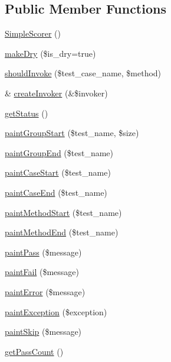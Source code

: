 \subsection*{Public Member Functions}
\begin{DoxyCompactItemize}
\item 
\hyperlink{class_simple_scorer_abe348a572a806ea640c69249318d800c}{SimpleScorer} ()
\item 
\hyperlink{class_simple_scorer_ade2fb6bafe296913437d154817e830ad}{makeDry} (\$is\_\-dry=true)
\item 
\hyperlink{class_simple_scorer_a8f0580062ffad69971b52c7e62bd8ad2}{shouldInvoke} (\$test\_\-case\_\-name, \$method)
\item 
\& \hyperlink{class_simple_scorer_a14b49e85d21162afc6f46f98220ad043}{createInvoker} (\&\$invoker)
\item 
\hyperlink{class_simple_scorer_a0efdf88692ba2649b3f68ab0812781f2}{getStatus} ()
\item 
\hyperlink{class_simple_scorer_a738721074c609d1ced9010b57cd0779c}{paintGroupStart} (\$test\_\-name, \$size)
\item 
\hyperlink{class_simple_scorer_a40b030cbba90f114374191cbed7d459d}{paintGroupEnd} (\$test\_\-name)
\item 
\hyperlink{class_simple_scorer_ae66388eacb1a7ef3f99443a942c8a9b1}{paintCaseStart} (\$test\_\-name)
\item 
\hyperlink{class_simple_scorer_af61cf47c364d7fbe592714776e588e2a}{paintCaseEnd} (\$test\_\-name)
\item 
\hyperlink{class_simple_scorer_a1467957d4a23761b8d23d5d0c88b9a89}{paintMethodStart} (\$test\_\-name)
\item 
\hyperlink{class_simple_scorer_a419382f8670b1d944f2036bb02dc2800}{paintMethodEnd} (\$test\_\-name)
\item 
\hyperlink{class_simple_scorer_a02d68e8d94800e50603413d1913c25d0}{paintPass} (\$message)
\item 
\hyperlink{class_simple_scorer_a25656682bd645cf156f3a2a87893d8b3}{paintFail} (\$message)
\item 
\hyperlink{class_simple_scorer_ac33eeacd9e121f39874f95eec7219b88}{paintError} (\$message)
\item 
\hyperlink{class_simple_scorer_af85813652ea0ec8aca7261267c121f6c}{paintException} (\$exception)
\item 
\hyperlink{class_simple_scorer_aa82186cb9bf706d675336aefd6ba355f}{paintSkip} (\$message)
\item 
\hyperlink{class_simple_scorer_aa41c54c949beb5344160a13418f8cb8b}{getPassCount} ()

\end{DoxyCompactItemize}
